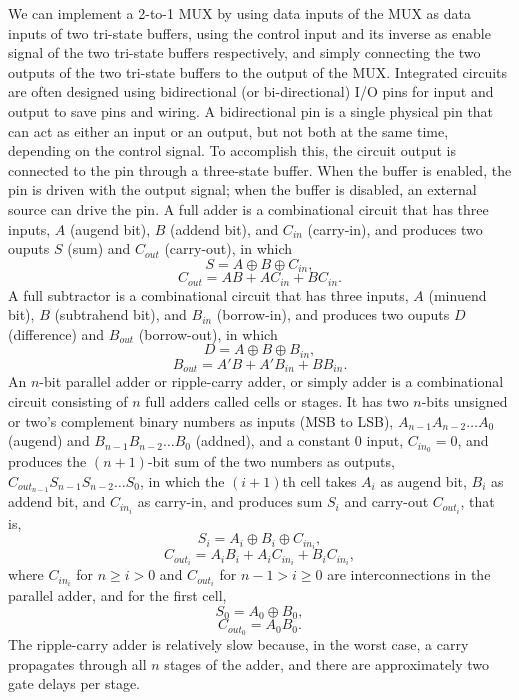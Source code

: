 \documentclass[a4paper,12pt]{article}
\begin{document}
\begin{itemize}
\begin{itemize}
\begin{itemize}
\begin{itemize}
\begin{itemize}
\begin{itemize}
\begin{itemize}
We can implement a 2-to-1 MUX by using data inputs of the MUX as data inputs of two tri-state buffers, using the control input and its inverse as enable signal of the two tri-state buffers respectively, and simply connecting the two outputs of the two tri-state buffers to the output of the MUX.
Integrated circuits are often designed using bidirectional (or bi-directional) I/O pins for input and output to save pins and wiring. A bidirectional pin is a single physical pin that can act as either an input or an output, but not both at the same time, depending on the control signal. To accomplish this, the circuit output is connected to the pin through a three-state buffer. When the buffer is enabled, the pin is driven with the output signal; when the buffer is disabled, an external source can drive the pin.
A full adder is a combinational circuit that has three inputs, $A$ (augend bit), $B$ (addend bit), and $C_{in}$ (carry-in), and produces two ouputs $S$ (sum) and $C_{out}$ (carry-out), in which
\[S=A\oplus B\oplus C_{in},\]
\[C_{out}=AB+AC_{in}+BC_{in}.\]
A full subtractor is a combinational circuit that has three inputs, $A$ (minuend bit), $B$ (subtrahend bit), and $B_{in}$ (borrow-in), and produces two ouputs $D$ (difference) and $B_{out}$ (borrow-out), in which
\[D=A\oplus B\oplus B_{in},\]
\[B_{out}=A'B+A'B_{in}+BB_{in}.\]
An $n$-bit parallel adder or ripple-carry adder, or simply adder is a combinational circuit consisting of $n$ full adders called cells or stages. It has two $n$-bits unsigned or two's complement binary numbers as inputs (MSB to LSB), $A_{n-1}A_{n-2}\ldots A_0$ (augend) and $B_{n-1}B_{n-2}\ldots B_0$ (addned), and a constant $0$ input, $C_{in_0}=0$, and produces the $(n+1)$-bit sum of the two numbers as outputs, $C_{out_{n-1}}S_{n-1}S_{n-2}\ldots S_0$, in which the $(i+1)$th cell takes $A_i$ as augend bit, $B_i$ as addend bit, and $C_{in_i}$ as carry-in, and produces sum $S_i$ and carry-out $C_{out_i}$, that is,
\[S_i=A_i\oplus B_i\oplus C_{in_i},\]
\[C_{out_i}=A_iB_i+A_iC_{in_i}+B_iC_{in_i},\]
where $C_{in_i}$ for $n\geq i>0$ and $C_{out_i}$ for $n-1>i\geq 0$ are interconnections in the parallel adder, and for the first cell,
\[S_0=A_0\oplus B_0,\]
\[C_{out_0}=A_0B_0.\]
The ripple-carry adder is relatively slow because, in the worst case, a carry propagates through all $n$ stages of the adder, and there are approximately two gate delays per stage.

\end{itemize}
\end{itemize}
\end{itemize}
\end{itemize}
\end{itemize}
\end{itemize}
\end{itemize}
\end{document}
